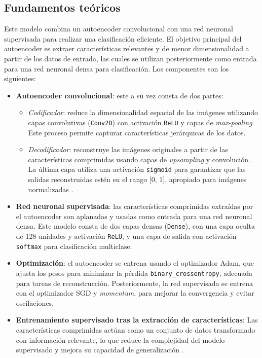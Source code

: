 \subsection{Fundamentos teóricos}

Este modelo combina un autoencoder convolucional con una red neuronal supervisada para realizar una clasificación eficiente. El objetivo principal del autoencoder es extraer características relevantes y de menor dimensionalidad a partir de los datos de entrada, las cuales se utilizan posteriormente como entrada para una red neuronal densa para clasificación. Los componentes son los siguientes:

\begin{itemize}
	\item \textbf{Autoencoder convolucional}: este a su vez consta de dos partes:
	\begin{itemize}
		\item \textit{Codificador}: reduce la dimensionalidad espacial de las imágenes utilizando capas convolutivas (\texttt{Conv2D}) con activación \texttt{ReLU} y capas de \textit{max-pooling}. Este proceso permite capturar características jerárquicas de los datos.
		\item \textit{Decodificador}: reconstruye las imágenes originales a partir de las características comprimidas usando capas de \textit{upsampling} y convolución. La última capa utiliza una activación \texttt{sigmoid} para garantizar que las salidas reconstruidas estén en el rango [0, 1], apropiado para imágenes normalizadas \parencite{vincent2010stacked}.
	\end{itemize}
	\item \textbf{Red neuronal supervisada}: las características comprimidas extraídas por el autoencoder son aplanadas y usadas como entrada para una red neuronal densa. Este modelo consta de dos capas densas (\texttt{Dense}), con una capa oculta de 128 unidades y activación \texttt{ReLU}, y una capa de salida con activación \texttt{softmax} para clasificación multiclase.
	\item \textbf{Optimización}: el autoencoder se entrena usando el optimizador Adam, que ajusta los pesos para minimizar la pérdida \texttt{binary\_crossentropy}, adecuada para tareas de reconstrucción. Posteriormente, la red supervisada se entrena con el optimizador SGD y \textit{momentum}, para mejorar la convergencia y evitar oscilaciones.
	\item \textbf{Entrenamiento supervisado tras la extracción de características}: Las características comprimidas actúan como un conjunto de datos transformado con información relevante, lo que reduce la complejidad del modelo supervisado y mejora su capacidad de generalización \parencite{hinton2006reducing}.
\end{itemize}

